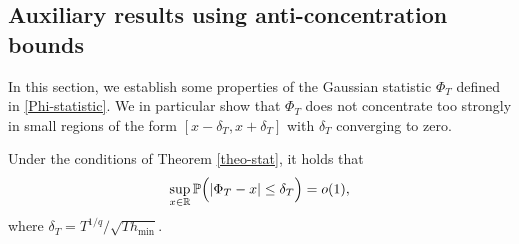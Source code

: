 \documentclass[a4paper,12pt]{article}
\numberwithin{equation}{section}
\begin{document}
\subsection*{Auxiliary results using anti-concentration bounds}


In this section, we establish some properties of the Gaussian statistic $\Phi_T$ defined in \eqref{Phi-statistic}. We in particular show that $\Phi_T$ does not concentrate too strongly in small regions of the form $[x-\delta_T,x+\delta_T]$ with $\delta_T$ converging to zero.  
%
%
\enlargethispage{0.1cm}
\begin{propA}\label{propA-anticon}
Under the conditions of Theorem \ref{theo-stat}, it holds that 
\[ \sup_{x \in \mathbb{R}} \mathbb{P} \Big( | \Phi_T - x | \le \delta_T \Big) = o(1), \]
where $\delta_T = T^{1/q} / \sqrt{T h_{\min}}$.
\end{propA}
%
%
\end{document}
